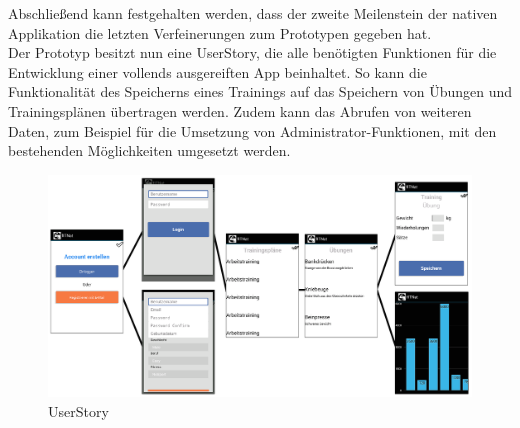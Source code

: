 Abschließend kann festgehalten werden, dass der zweite Meilenstein der nativen Applikation die letzten Verfeinerungen zum Prototypen gegeben hat.\\
Der Prototyp besitzt nun eine \gls{UserStory}, die alle benötigten Funktionen für die Entwicklung einer vollends ausgereiften \gls{App} beinhaltet. So kann die Funktionalität des Speicherns eines Trainings auf das Speichern von Übungen und Trainingsplänen übertragen werden. Zudem kann das Abrufen von weiteren Daten, zum Beispiel für die Umsetzung von Administrator-Funktionen, mit den bestehenden Möglichkeiten umgesetzt werden.

\begin{figure}[!htbp]
\centering
\includegraphics[width=\textwidth, angle={90}]{content/images/UserStory}
\caption{UserStory}
\label{pic:UserStory}
\end{figure}


